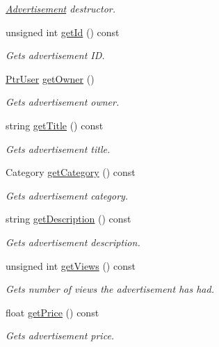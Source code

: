 \begin{DoxyCompactItemize}
\begin{DoxyCompactList}\small\item\em \hyperlink{class_advertisement}{Advertisement} destructor. \end{DoxyCompactList}\item 
unsigned int \hyperlink{class_advertisement_aa66d9158d12ae99a04f81cf2adb155fd}{get\+Id} () const 
\begin{DoxyCompactList}\small\item\em Gets advertisement I\+D. \end{DoxyCompactList}\item 
\hyperlink{class_ptr_user}{Ptr\+User} \hyperlink{class_advertisement_a79a18c34607cef5cfc30afffea734327}{get\+Owner} ()
\begin{DoxyCompactList}\small\item\em Gets advertisement owner. \end{DoxyCompactList}\item 
string \hyperlink{class_advertisement_ac65aa68caf2b1697c0cc04f2ebb0fd99}{get\+Title} () const 
\begin{DoxyCompactList}\small\item\em Gets advertisement title. \end{DoxyCompactList}\item 
Category \hyperlink{class_advertisement_a123c05d427fed1ac7fec0f55050da20d}{get\+Category} () const 
\begin{DoxyCompactList}\small\item\em Gets advertisement category. \end{DoxyCompactList}\item 
string \hyperlink{class_advertisement_ac455b4918dbd923af81efbaebf924985}{get\+Description} () const 
\begin{DoxyCompactList}\small\item\em Gets advertisement description. \end{DoxyCompactList}\item 
unsigned int \hyperlink{class_advertisement_a823c798799bcdf75a5b65158d6ad8c96}{get\+Views} () const 
\begin{DoxyCompactList}\small\item\em Gets number of views the advertisement has had. \end{DoxyCompactList}\item 
float \hyperlink{class_advertisement_a6c7a08129880f12744853f9ceeb172ee}{get\+Price} () const 
\begin{DoxyCompactList}\small\item\em Gets advertisement price. \end{DoxyCompactList}\item 

\end{DoxyCompactItemize}
